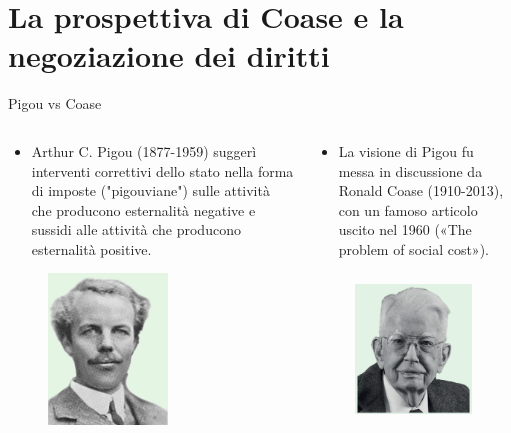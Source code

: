\documentclass[aspectratio=64,11pt]{beamer}
\begin{document}
\section{La prospettiva di Coase e la negoziazione dei diritti}

\begin{frame}{Pigou vs Coase}
\begin{columns}
\begin{column}{.5\columnwidth}
\begin{itemize}
\item Arthur C. Pigou (1877-1959) suggerì interventi correttivi dello stato nella
forma di imposte ("\alert{pigouviane}") sulle attività che producono esternalità
negative e sussidi alle attività che producono esternalità positive.
\end{itemize}
\begin{figure}[htbp]
\centering
\includegraphics[height=4cm]{./figure/Pigou.png}
\end{figure}
\end{column}
\begin{column}{.5\columnwidth}
\begin{itemize}
\item La visione di Pigou fu messa in discussione da Ronald Coase (1910-2013), con
un famoso articolo uscito nel 1960 («The problem of social cost»).
\end{itemize}
\begin{figure}[htbp]
\centering
\includegraphics[height=4cm]{./figure/Coase.png}
\end{figure}
\end{column}
\end{columns}
\end{frame}
\end{document}

